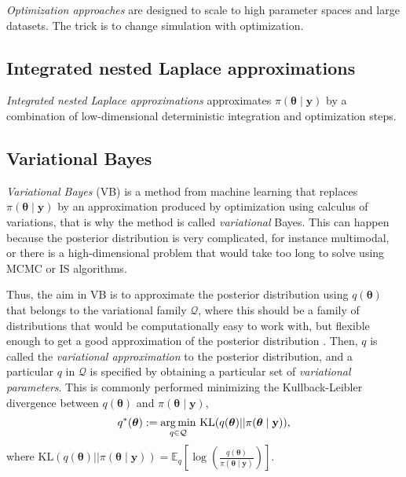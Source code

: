 \textit{Optimization approaches} are designed to scale to high parameter spaces and large datasets. The trick is to change simulation with optimization. 

\subsection{Integrated nested Laplace approximations}\label{sec15_21}
\textit{Integrated nested Laplace approximations} approximates $\pi(\boldsymbol{\theta} \mid \mathbf{y})$ by a combination of low-dimensional deterministic integration and optimization steps. 

\subsection{Variational Bayes}\label{sec15_22}
\textit{Variational Bayes} (VB) is a method from machine learning \cite{jordan1999introduction,wainwright2008graphical} that replaces $\pi(\boldsymbol{\theta} \mid \mathbf{y})$ by an approximation produced by optimization using calculus of variations, that is why the method is called \textit{variational} Bayes. This can happen because the posterior distribution is very complicated, for instance multimodal, or there is a high-dimensional problem that would take too long to solve using MCMC or IS algorithms. 

Thus, the aim in VB is to approximate the posterior distribution using $q(\boldsymbol{\theta})$ that belongs to the variational family $\mathcal{Q}$, where this should be a family of distributions that would be computationally easy to work with, but flexible enough to get a good approximation of the posterior distribution \cite{blei2017variational}. Then, $q$ is called the \textit{variational approximation} to the posterior distribution, and a particular $q$ in $\mathcal{Q}$ is specified by obtaining a particular set of \textit{variational parameters}. This is commonly performed minimizing the Kullback-Leibler divergence between $q(\boldsymbol{\theta})$ and $\pi(\boldsymbol{\theta} \mid \mathbf{y})$,
\begin{align}\label{eq:VB1}
	q^*(\boldsymbol{\theta}):=\underset{q \in \mathcal{Q}}{\argmin} \  \text{KL}(q(\boldsymbol{\theta})||\pi(\boldsymbol{\theta} \mid \mathbf{y})),
\end{align}  
where $\text{KL}(q(\boldsymbol{\theta})||\pi(\boldsymbol{\theta} \mid \mathbf{y}))=\mathbb{E}_q\left[\log\left(\frac{q(\boldsymbol{\theta})}{\pi(\boldsymbol{\theta} \mid \mathbf{y})}\right)\right]$. 

